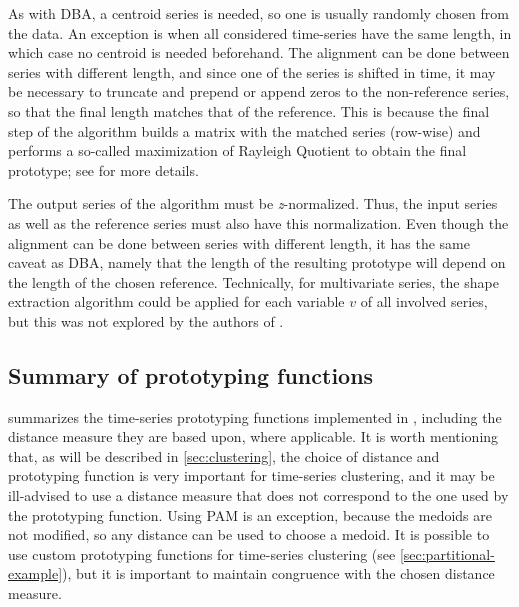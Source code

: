 As with DBA, a centroid series is needed,
so one is usually randomly chosen from the data.
An exception is when all considered time-series have the same length,
in which case no centroid is needed beforehand.
The alignment can be done between series with different length,
and since one of the series is shifted in time,
it may be necessary to truncate and prepend or append zeros to the non-reference series,
so that the final length matches that of the reference.
This is because the final step of the algorithm builds a matrix with the matched series (row-wise) and performs a so-called maximization of Rayleigh Quotient to obtain the final prototype;
see \citet{paparrizos2015} for more details.

The output series of the algorithm must be \textit{z}-normalized.
Thus, the input series as well as the reference series must also have this normalization.
Even though the alignment can be done between series with different length,
it has the same caveat as DBA,
namely that the length of the resulting prototype will depend on the length of the chosen reference.
Technically, for multivariate series,
the shape extraction algorithm could be applied for each variable $v$ of all involved series,
but this was not explored by the authors of \kshape{}.

\subsection{Summary of prototyping functions}
\label{sec:prototypes-summary}

 summarizes the time-series prototyping functions implemented in \dtwclust{},
including the distance measure they are based upon,
where applicable.
It is worth mentioning that,
as will be described in \cref{sec:clustering},
the choice of distance and prototyping function is very important for time-series clustering,
and it may be ill-advised to use a distance measure that does not correspond to the one used by the prototyping function.
Using PAM is an exception,
because the medoids are not modified,
so any distance can be used to choose a medoid.
It is possible to use custom prototyping functions for time-series clustering
(see \cref{sec:partitional-example}),
but it is important to maintain congruence with the chosen distance measure.

